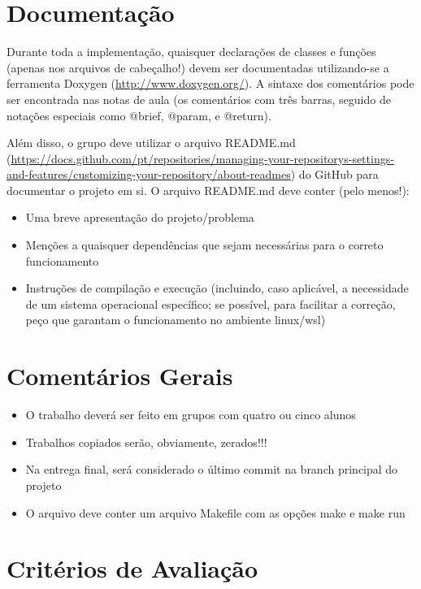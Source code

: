 \documentclass[11pt]{article}
\begin{document}
\section{Documentação}
\label{sec:org1539532}

Durante toda a implementação, quaisquer declarações de classes e
funções (apenas nos arquivos de cabeçalho!) devem ser documentadas
utilizando-se a ferramenta Doxygen (\url{http://www.doxygen.org/}). A
sintaxe dos comentários pode ser encontrada nas notas de aula (os
comentários com três barras, seguido de notações especiais como
@brief, @param, e @return).

Além disso, o grupo deve utilizar o arquivo README.md
(\url{https://docs.github.com/pt/repositories/managing-your-repositorys-settings-and-features/customizing-your-repository/about-readmes})
do GitHub para documentar o projeto em si. O arquivo README.md deve
conter (pelo menos!):

\begin{itemize}
\item Uma breve apresentação do projeto/problema
\item Menções a quaisquer dependências que sejam necessárias para
o correto funcionamento
\item Instruções de compilação e execução (incluindo, caso aplicável, a
necessidade de um sistema operacional específico; se possível, para
facilitar a correção, peço que garantam o funcionamento no ambiente
linux/wsl)
\end{itemize}
\section{Comentários Gerais}
\label{sec:orgd5622c3}

\begin{itemize}
\item O trabalho deverá ser feito em grupos com quatro ou cinco alunos
\item Trabalhos copiados serão, obviamente, zerados!!!
\item Na entrega final, será considerado o último commit na branch principal do projeto
\item O arquivo deve conter um arquivo Makefile com as opções make e make run
\end{itemize}
\section{Critérios de Avaliação}
\label{sec:org47ee3d4}
\end{document}
